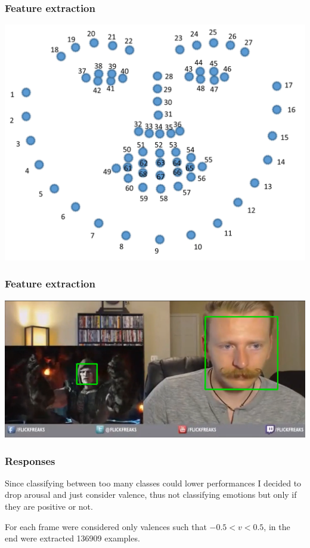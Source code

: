 \documentclass{beamer}
\begin{document}
\begin{frame}
    \frametitle{Feature extraction}
    \begin{center}
        \includegraphics[scale=0.15]{../report/images/landmark.png}
    \end{center}
\end{frame}

\begin{frame}
    \frametitle{Feature extraction}
    \begin{center}
        \includegraphics[scale=0.3]{../report/images/309mp4_double_face.png}
    \end{center}
\end{frame}

\begin{frame}
    \frametitle{Responses}
    Since classifying between too many classes could lower performances I decided to drop arousal and just consider valence, thus not classifying emotions but only if they are positive or not.

    For each frame were considered only valences such that $ -0.5 < v < 0.5$, in the end were extracted 136909 examples.
\end{frame}
\end{document}
